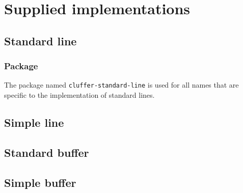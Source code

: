 \chapter{Supplied implementations}
\label{chap-supplied-implementations}

\section{Standard line}

\subsection{Package}

The package named \texttt{cluffer-standard-line} is used for all names
that are specific to the implementation of standard lines.

\section{Simple line}

\section{Standard buffer}

\section{Simple buffer}
